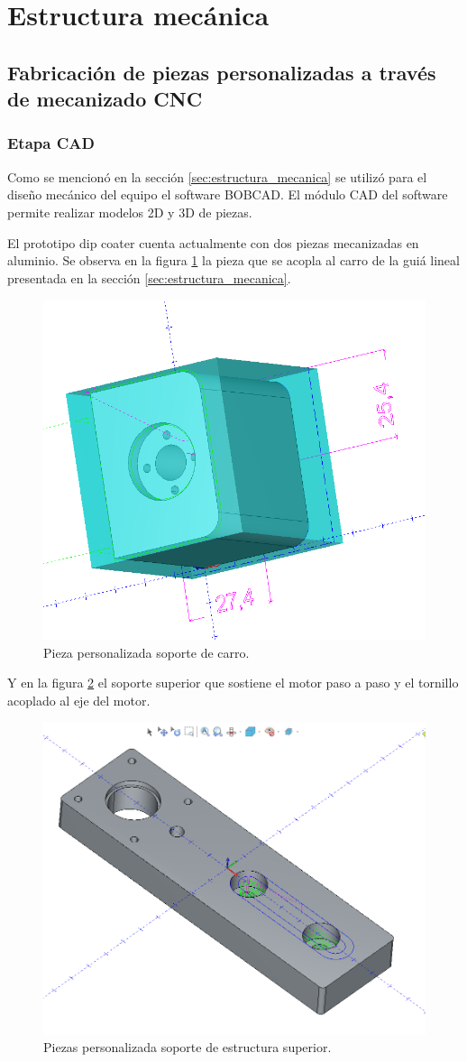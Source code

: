 \section{Estructura mecánica}
\subsection{Fabricación de piezas personalizadas a través de mecanizado CNC}

\subsubsection{Etapa CAD}

Como se mencionó en la sección \ref{sec:estructura_mecanica} se utilizó para el diseño mecánico del equipo el software BOBCAD. El módulo CAD del software permite realizar modelos 2D y 3D de piezas.

El prototipo dip coater cuenta actualmente con dos piezas mecanizadas en aluminio. Se observa en la figura \ref{fig:carro} la pieza que se acopla al carro de la guiá lineal presentada en la sección \ref{sec:estructura_mecanica}.

\begin{figure}[ht]
	\centering
	\includegraphics[width=.5\textwidth]{./Figures/3d_carro.png}
	\caption{Pieza personalizada soporte de carro.}
	\label{fig:carro}
\end{figure}

Y en la figura \ref{fig:estructura_superior} el soporte superior que sostiene el motor paso a paso y el  tornillo acoplado al eje del motor.

\begin{figure}[h]
	\centering
	\includegraphics[width=.5\textwidth]{./Figures/3d_top.png}
	\caption{Piezas personalizada soporte de estructura superior.}
	\label{fig:estructura_superior}
\end{figure}

